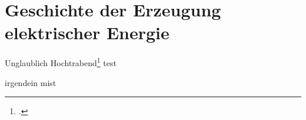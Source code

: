 \section{Geschichte der Erzeugung elektrischer Energie}
Unglaublich Hochtrabend\footcite[159]{Watts1993}
test


irgendein mist